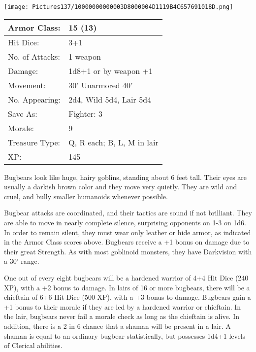 \documentclass[a4paper,twoside,openany,10pt]{book}
\begin{document}
\begin{multicols}{2}
\begin{center}
\texttt{[image: Pictures137/10000000000003D8000004D1119B4C657691018D.png]}\medskip
\end{center}

\begin{center}
	\begin{tabularx}{0.48\textwidth}{@{}lX@{}}
Armor Class: & 15 (13) \\\hline
Hit Dice: & 3+1 \\\hline
No. of Attacks: & 1 weapon \\\hline
Damage: & 1d8+1 or by weapon +1 \\\hline
Movement: & 30' Unarmored 40' \\\hline
No. Appearing: & 2d4, Wild 5d4, Lair 5d4 \\\hline
Save As: & Fighter: 3 \\\hline
Morale: & 9 \\\hline
Treasure Type: & Q, R each; B, L, M in lair \\\hline
XP: & 145 \\\hline
\end{tabularx}\medskip
\end{center}

Bugbears look like huge, hairy goblins, standing about 6 feet tall. Their eyes are usually a darkish brown color and they move very quietly. They are wild and cruel, and bully smaller humanoids whenever possible. 

Bugbear attacks are coordinated, and their tactics are sound if not brilliant. They are able to move in nearly complete silence, surprising opponents on 1-3 on 1d6. In order to remain silent, they must wear only leather or hide armor, as indicated in the Armor Class scores above. Bugbears receive a +1 bonus on damage due to their great Strength. As with most goblinoid monsters, they have Darkvision with a 30' range.

One out of every eight bugbears will be a hardened warrior of 4+4 Hit Dice (240 XP), with a +2 bonus to damage. In lairs of 16 or more bugbears, there will be a chieftain of 6+6 Hit Dice (500 XP), with a +3 bonus to damage. Bugbears gain a +1 bonus to their morale if they are led by a hardened warrior or chieftain. In the lair, bugbears never fail a morale check as long as the chieftain is alive. In addition, there is a 2 in 6 chance that a shaman will be present in a lair. A shaman is equal to an ordinary bugbear statistically, but possesses 1d4+1 levels of Clerical abilities.\medskip




\end{multicols}
\end{document}
